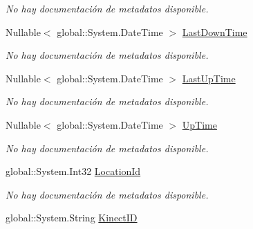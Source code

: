 \begin{DoxyCompactItemize}
\begin{DoxyCompactList}\small\item\em No hay documentación de metadatos disponible. \end{DoxyCompactList}\item 
Nullable$<$ global\-::\-System.\-Date\-Time $>$ \hyperlink{class_microsoft_1_1_samples_1_1_kinect_1_1_basic_interactions_1_1_advert_hosts_af374fb4ee99d5cfe8a5d6012a50fe2af}{Last\-Down\-Time}
\begin{DoxyCompactList}\small\item\em No hay documentación de metadatos disponible. \end{DoxyCompactList}\item 
Nullable$<$ global\-::\-System.\-Date\-Time $>$ \hyperlink{class_microsoft_1_1_samples_1_1_kinect_1_1_basic_interactions_1_1_advert_hosts_afe8d092bd9e77dc94001027e907f42b5}{Last\-Up\-Time}
\begin{DoxyCompactList}\small\item\em No hay documentación de metadatos disponible. \end{DoxyCompactList}\item 
Nullable$<$ global\-::\-System.\-Date\-Time $>$ \hyperlink{class_microsoft_1_1_samples_1_1_kinect_1_1_basic_interactions_1_1_advert_hosts_a060ddb118e9335b96f36742f98f1d352}{Up\-Time}
\begin{DoxyCompactList}\small\item\em No hay documentación de metadatos disponible. \end{DoxyCompactList}\item 
global\-::\-System.\-Int32 \hyperlink{class_microsoft_1_1_samples_1_1_kinect_1_1_basic_interactions_1_1_advert_hosts_ab76095dd915b64fc4ecf568ff6635709}{Location\-Id}
\begin{DoxyCompactList}\small\item\em No hay documentación de metadatos disponible. \end{DoxyCompactList}\item 
global\-::\-System.\-String \hyperlink{class_microsoft_1_1_samples_1_1_kinect_1_1_basic_interactions_1_1_advert_hosts_ae2965abfc1eb70e27b9fb09324148bfc}{Kinect\-I\-D}

\end{DoxyCompactItemize}
